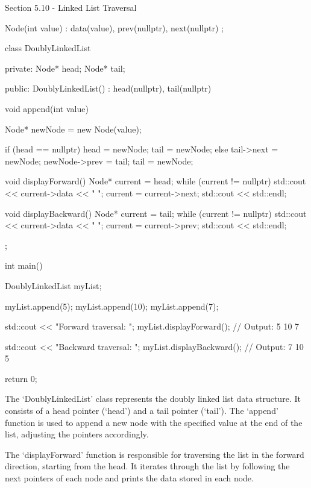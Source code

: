\begin{notes}{Section 5.10 - Linked List Traversal}
\begin{highlight}
\begin{code}[C++]
{            Node(int value) : data(value), prev(nullptr), next(nullptr) {}
        };
        
        class DoublyLinkedList {
        private:
            Node* head;
            Node* tail;
        
        public:
            DoublyLinkedList() : head(nullptr), tail(nullptr) {}
        
            void append(int value) {
                Node* newNode = new Node(value);
        
                if (head == nullptr) {
                    head = newNode;
                    tail = newNode;
                } else {
                    tail->next = newNode;
                    newNode->prev = tail;
                    tail = newNode;
                }
            }
        
            void displayForward() {
                Node* current = head;
                while (current != nullptr) {
                    std::cout << current->data << " ";
                    current = current->next;
                }
                std::cout << std::endl;
            }
        
            void displayBackward() {
                Node* current = tail;
                while (current != nullptr) {
                    std::cout << current->data << " ";
                    current = current->prev;
                }
                std::cout << std::endl;
            }
        };
        
        int main() {
            DoublyLinkedList myList;
        
            myList.append(5);
            myList.append(10);
            myList.append(7);
        
            std::cout << "Forward traversal: ";
            myList.displayForward();  // Output: 5 10 7
        
            std::cout << "Backward traversal: ";
            myList.displayBackward();  // Output: 7 10 5
        
            return 0;
        }        
        \end{code}
        The `DoublyLinkedList' class represents the doubly linked list data structure. It consists of a head pointer (`head') and a tail pointer (`tail'). The `append' function is used to append a new node with the specified value at the end of the list, adjusting the pointers accordingly.
    
        The `displayForward' function is responsible for traversing the list in the forward direction, starting from the head. It iterates through the list by following the next pointers of each node and prints the data stored in each node.
    

\end{highlight}
\end{notes}
